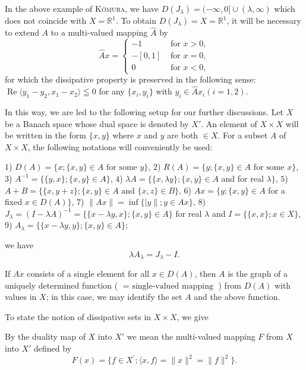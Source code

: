 In the above example of \textsc{Kōmura}, we have $D(J_{\lambda}) = (-\infty, 0] \cup (\lambda, \infty)$ which does not coincide with $X = \mathbb{R}^{1}$. To obtain $D(J_{\lambda}) = X = \mathbb{R}^{1}$, it will be necessary to extend $A$ to a multi-valued mapping $\hat{A}$ by 
\[
\hat {A} x = \begin{cases}- 1 & \text{ for } x > 0, \\ - [ 0, 1 ] & \text{ for } x = 0, \\ 0 & \text{ for } x < 0,\end{cases}
\]
for which the dissipative property is preserved in the following sense: $\operatorname{Re}\langle y_1 - y_2, x_1 - x_2 \rangle \leqq 0$ for any $\{x_i, y_i\}$ with $y_i \in \hat{A} x_i (i = 1, 2)$. \label{eq:XIV.6.2'} 

In this way, we are led to the following setup for our further discussions. Let $X$ be a Banach space whose dual space is denoted by $X'$. An element of $X \times X$ will be written in the form $\{x, y\}$ where $x$ and $y$ are both $\in X$. For a subset $A$ of $X \times X$, the following notations will conveniently be used: 

$1$) $D(A) = \{x; \{x, y\} \in A \text{ for some } y\}$, 
$2$) $R(A) = \{y; \{x, y\} \in A \text{ for some } x\}$, 
$3$) $A^{-1} = \{\{y, x\}; \{x, y\} \in A\}$, 
$4$) $\lambda A = \{\{x, \lambda y\}; \{x, y\} \in A$ and for real $\lambda\}$, 
$5$) $A + B = \{\{x, y + z\}; \{x, y\} \in A \text{ and } \{x, z\} \in B\}$, 
$6$) $A x = \{y; \{x, y\} \in A$ for a fixed $x \in D(A)\}$, 
$7$) $\|Ax\| = \inf \{|y\|; y \in Ax\}$, 
$8$) $J_{\lambda} = (I - \lambda A)^{-1} = \{\{x - \lambda y, x\} ; \{x, y\} \in A\}$ for real $\lambda$ and $I = \{\{x, x\} ; x \in X\}$, 
$9$) $A_{\lambda} = \{\{x - \lambda y, y\}; \{x, y\} \in A\}$; 

we have 
\begin{equation}\label{eq:XIV.6.3}
\lambda A _{\lambda} = J _{\lambda} - I.
\end{equation}

If $A x$ consists of a single element for all $x \in D(A)$, then $A$ is the graph of a uniquely determined function ( $= \text{ single-valued mapping }$) from $D(A)$ with values in $X$; in this case, we may identify the set $A$ and the above function. 

To state the notion of dissipative sets in $X \times X$, we give 

\begin{definition}\label{def:XIV.6.Definition.1} By the duality map of $X$ into $X'$ we mean the multi-valued mapping $F$ from $X$ into $X'$ defined by 
\begin{equation}\label{eq:XIV.6.4}
F (x) = \{f \in X ^{\prime}; \langle x, f \rangle = \| x \| ^{2} = \| f \| ^{2} \}.
\end{equation}
\end{definition}

